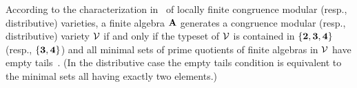 
According to the characterization
in~\cite[Chapter~8]{HM:1988} of locally finite congruence modular (resp.,
distributive) varieties, a finite algebra $\mathbf{A}$ generates a congruence modular
(resp., distributive) variety $\mathcal{V}$ if and only if the typeset 
of $\mathcal{V}$ is
contained in $\{\textbf{2}, \textbf{3}, \textbf{4}\}$ (resp., $\{\textbf{3}, \textbf{4}\}$) 
and all minimal sets of prime
quotients of finite algebras in $\mathcal{V}$ have empty
tails~\cite[Def.~2.15]{HM:1988}. (In the distributive 
case the empty tails condition is equivalent to the minimal sets all having exactly
two elements.)

